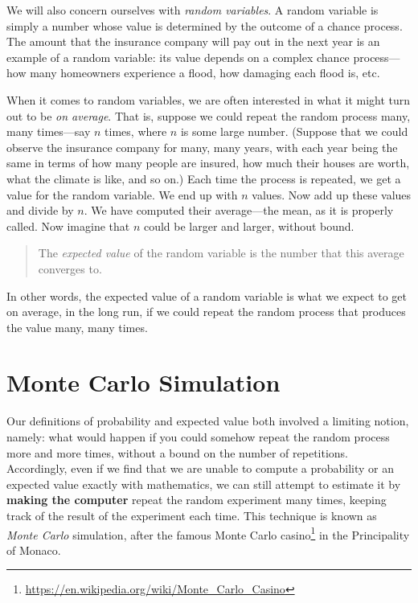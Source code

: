 \documentclass[]{book}
\let\rmarkdownfootnote\footnote%
\def\footnote{\protect\rmarkdownfootnote}
\renewcommand{\href}[2]{#2\footnote{\url{#1}}}
\renewcommand{\href}[2]{#2\footnote{\url{#1}}}
\theoremstyle{definition}
\theoremstyle{definition}
\theoremstyle{remark}
\begin{document}
{We will also concern ourselves with \emph{random variables}.
A random variable is simply a number whose value
is determined by the outcome of a chance process. The amount that the
insurance company will pay out in the next year is an example of a
random variable: its value depends on a complex chance process---how
many homeowners experience a flood, how damaging each flood is, etc.

When it comes to random variables, we are often interested in what it
might turn out to be \emph{on average}. That is, suppose we could repeat
the random process many, many times---say \(n\) times, where \(n\) is
some large number. (Suppose that we could observe the insurance company
for many, many years, with each year being the same in terms of how many
people are insured, how much their houses are worth, what the climate is
like, and so on.) Each time the process is repeated, we get a value for
the random variable. We end up with \(n\) values. Now add up these
values and divide by \(n\). We have computed their average---the mean,
as it is properly called. Now imagine that \(n\) could be larger and
larger, without bound.

\begin{quote}
The \emph{expected value} of the random variable
is the number that this average converges to.
\end{quote}

In other words, the expected value of a random variable is what we
expect to get on average, in the long run, if we could repeat the random
process that produces the value many, many times.

\section{Monte Carlo Simulation}\label{monte-carlo-simulation}

Our definitions of probability and expected value both involved a
limiting notion, namely: what would happen if you could somehow repeat
the random process more and more times, without a bound on the number of
repetitions. Accordingly, even if we find that we are unable to compute
a probability or an expected value exactly with mathematics, we can
still attempt to estimate it by \textbf{making the computer} repeat the
random experiment many times, keeping track of the result of the
experiment each time. This technique is known as \emph{Monte Carlo}
simulation, after the famous
\href{https://en.wikipedia.org/wiki/Monte_Carlo_Casino}{Monte Carlo
casino} in the Principality of Monaco.

}
\end{document}
